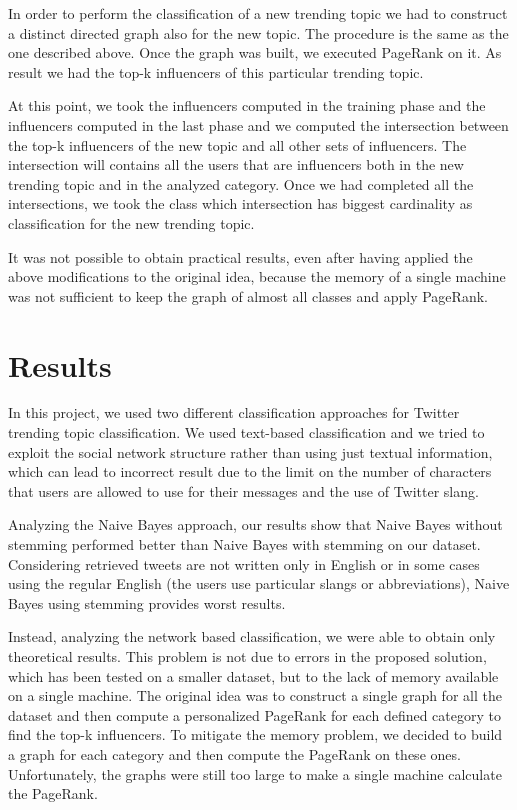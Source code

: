\documentclass[journal,11pt]{vgtc}
\begin{document}
In order to perform the classification of a new trending topic we had to construct a distinct directed graph
also for the new topic. The procedure is the same as the one described above.
Once the graph was built, we executed PageRank on it.
As result we had the top-k influencers of this particular trending topic.

At this point, we took the influencers computed in the training phase and the influencers computed in the
last phase and we computed the intersection between the top-k influencers of the new topic and
all other sets of influencers.
The intersection will contains all the users that are influencers both
in the new trending topic and in the analyzed category.
Once we had completed all the intersections, we took the class which intersection has biggest cardinality
as classification for the new trending topic.

It was not possible to obtain practical results, even after having applied the above modifications
to the original idea, because the memory of a single machine was not sufficient to keep the graph of almost all
classes and apply PageRank.

\section{Results}
In this project, we used two different classification approaches for Twitter trending topic classification.
We used text-based classification and we tried to exploit the social network structure rather than
using just textual information, which can lead to incorrect result due to the limit on the number of characters
that users are allowed to use for their messages and the use of Twitter slang.

Analyzing the Naive Bayes approach, our results show that Naive Bayes without stemming
performed better than Naive Bayes with stemming on our dataset. Considering retrieved tweets are not
written only in English or in some cases using the regular English (the users use particular slangs or abbreviations),
Naive Bayes using stemming provides worst results.

Instead, analyzing the network based classification, we were able to obtain only theoretical results.
This problem is not due to errors in the proposed solution, which has been tested on a smaller dataset,
but to the lack of memory available on a single machine.
The original idea was to construct a single graph for all the dataset and then compute a personalized
PageRank for each defined category to find the top-k influencers. To mitigate the memory problem, we decided
to build a graph for each category and then compute the PageRank on these ones.
Unfortunately, the graphs were still too large to make a single machine calculate the PageRank.








\end{document}
